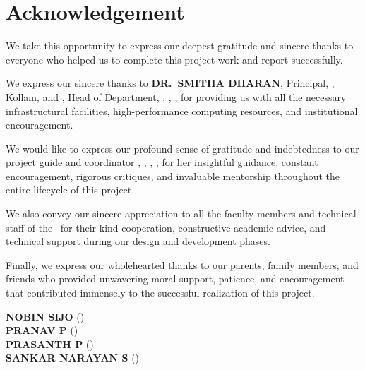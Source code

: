 \chapter*{Acknowledgement}%
%

\noindent We take this opportunity to express our deepest gratitude and sincere thanks to everyone who helped us to complete this project work and report successfully.

\vspace{10pt}

\noindent We express our sincere thanks to \textbf{\MakeUppercase{Dr.~Smitha Dharan}}, Principal, \college, Kollam, and \textbf{\MakeUppercase{\hod}}, Head of Department, \dept, \college, \collegeplace, for providing us with all the necessary infrastructural facilities, high-performance computing resources, and institutional encouragement.

\vspace{10pt}

\noindent We would like to express our profound sense of gratitude and indebtedness to our project guide and coordinator \mbox{\textbf{\MakeUppercase{\guide}}}, \guidedes, \dept, \college, for her insightful guidance, constant encouragement, rigorous critiques, and invaluable mentorship throughout the entire lifecycle of this project.

\vspace{10pt}

\noindent We also convey our sincere appreciation to all the faculty members and technical staff of the \dept\ for their kind cooperation, constructive academic advice, and technical support during our design and development phases.

\vspace{10pt}

\noindent Finally, we express our wholehearted thanks to our parents, family members, and friends who provided unwavering moral support, patience, and encouragement that contributed immensely to the successful realization of this project.

\vspace*{28pt}
\begin{flushright}
	\textbf{NOBIN SIJO} (\rollnoA) \\[3pt]
	\textbf{PRANAV P} (\rollnoB) \\[3pt]
	\textbf{PRASANTH P} (\rollnoC) \\[3pt]
	\textbf{SANKAR NARAYAN S} (\rollnoD)
\end{flushright}

\thispagestyle{plain}

